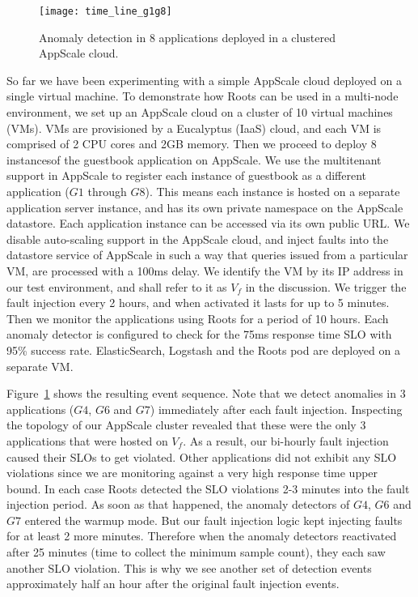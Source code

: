 \begin{figure}
\centering
\texttt{[image: time\_line\_g1g8]}
\caption{Anomaly detection in 8 applications deployed in a clustered AppScale cloud.}
\label{fig:time_line_g1g8}
\end{figure}

So far we have been experimenting with a simple AppScale cloud deployed on a single virtual machine.
To demonstrate how Roots can be used in a multi-node environment, we set up an AppScale cloud
on a cluster of 10 virtual machines (VMs). VMs are provisioned by a Eucalyptus (IaaS)
cloud, and each VM is comprised of 2 CPU cores and 2GB memory. Then we proceed
to deploy 8 instancesof the guestbook application on AppScale. We use the multitenant support
in AppScale to register each instance of guestbook as a different application ($G1$ through $G8$). This means each instance
is hosted on a separate application server instance, and has its own private namespace on the AppScale
datastore. Each application instance can be accessed via its own public URL. We disable auto-scaling support in 
the AppScale cloud, and inject faults into the datastore service of AppScale in such a way that queries
issued from a particular VM, are processed with a 100ms delay. We identify the VM by its IP address
in our test environment, and shall refer to it as $V_f$ in the discussion. We trigger
the fault injection every 2 hours, and when activated it lasts for up to 5 minutes. Then we monitor
the applications using Roots for a period of 10 hours. Each anomaly detector is configured
to check for the 75ms response time SLO with 95\% success rate. 
ElasticSearch, Logstash and the Roots pod are deployed on a separate VM. 

Figure~\ref{fig:time_line_g1g8} shows the resulting event sequence. Note that we detect anomalies 
in 3 applications ($G4$, $G6$ and $G7$) immediately after each fault injection. Inspecting the 
topology of our AppScale cluster revealed that these were the only 3 applications that were 
hosted on $V_f$. As a result, our bi-hourly fault injection caused their SLOs to
get violated. Other applications did not exhibit any SLO violations since we are monitoring against
a very high response time upper bound. In each case Roots detected the SLO violations 2-3 minutes into the fault injection
period. As soon as that happened, the anomaly detectors of $G4$, $G6$ and $G7$ entered the warmup mode.
But our fault injection logic kept injecting faults for at least 2 more minutes. Therefore when the anomaly detectors
reactivated after 25 minutes (time to collect the minimum sample count), they each saw another SLO
violation. This is why we see another set of detection events approximately half an hour after the
original fault injection events.

